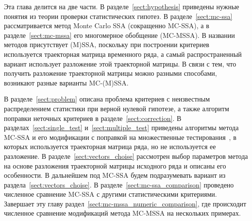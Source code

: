 \documentclass[specialist,
substylefile = spbu_report.rtx,
subf,href,colorlinks=true, 12pt]{disser}
\theoremstyle{definition}
\begin{document}
Эта глава делится на две части. В разделе~\ref{sect:hypothesis} приведены нужные понятия из теории проверки статистических гипотез. В разделе~\ref{sect:mc-ssa} рассматривается метод Monte Carlo SSA (сокращенно MC-SSA), а в разделе~\ref{sect:mc-mssa} его многомерное обобщение (MC-MSSA). В названии методов присутствует (M)SSA, поскольку при построении критериев используется траекторная матрица временного ряда, а самый распространенный вариант использует разложение этой траекторной матрицы. В связи с тем, что получить разложение траекторной матрицы можно разными способами, возникают разные варианты MC-(M)SSA.

В разделе~\ref{sect:problem} описана проблема критериев с неизвестным распределением статистики при верной нулевой гипотезе, а также алгоритм поправки неточных критериев в разделе~\ref{sect:correction}. В разделах~\ref{sect:single_test} и~\ref{sect:multiple_test} приведены алгоритмы метода MC-SSA и его модификации с поправкой на множественные тестирования~\cite{Golyandina2023}, в которых используется траекторная матрица ряда, но не используется ее разложение. В разделе~\ref{sect:vectors_choise} рассмотрен выбор параметров метода на основе разложения траекторной матрицы исходного ряда и описаны его особенности. В дальнейшем под MC-SSA будем подразумевать вариант из раздела~\ref{sect:vectors_choise}. В разделе~\ref{sect:mc-ssa_comparison} проведено численное сравнение MC-SSA с другими статистическими критериями. Завершает эту главу раздел~\ref{sect:mc-mssa_numeric_comparison}, где происходит численное сравнение модификаций метода MC-MSSA на нескольких примерах.
\end{document}
